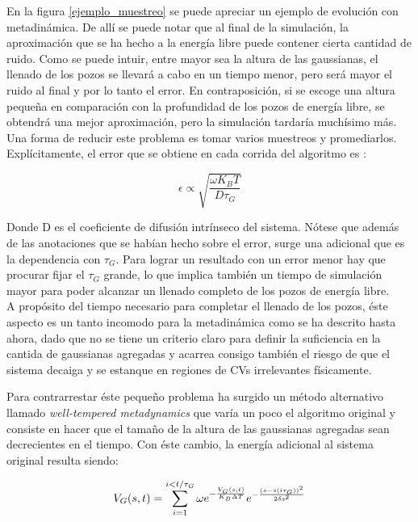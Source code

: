 \documentclass [11pt]{article}
\begin{document}
En la figura \ref{ejemplo_muestreo} se puede apreciar un ejemplo de evolución con metadinámica. De allí se puede notar que al final de la simulación, la aproximación que se ha hecho a la energía libre puede contener cierta cantidad de ruido. Como se puede intuir, entre mayor sea la altura de las gaussianas, el llenado de los pozos se llevará a cabo en un tiempo menor, pero será mayor el ruido al final y por lo tanto el error. En contraposición, si se escoge una altura pequeña en comparación con la profundidad de los pozos de energía libre, se obtendrá una mejor aproximación, pero la simulación tardaría muchísimo más. Una forma de reducir este problema es tomar varios muestreos y promediarlos. Explícitamente, el error que se obtiene en cada corrida del algoritmo es \cite{barducci}:

\begin{equation}
    \epsilon \propto\sqrt{\frac{\omega K_BT}{D\tau_G}}
\end{equation}

Donde D es el coeficiente de difusión intrínseco del sistema. Nótese que además de las anotaciones que se habían hecho sobre el error, surge una adicional que es la dependencia con $\tau_G$. Para lograr un resultado con un error menor hay que procurar fijar el $\tau_G$ grande, lo que implica también un tiempo de simulación mayor para poder alcanzar un llenado completo de los pozos de energía libre.\\

A propósito del tiempo necesario para completar el llenado de los pozos, éste aspecto es un tanto incomodo para la metadinámica como se ha descrito hasta ahora, dado que no se tiene un criterio claro para definir la suficiencia en la cantida de gaussianas agregadas y acarrea consigo también el riesgo de que el sistema decaiga y se estanque en regiones de CVs irrelevantes físicamente.

Para contrarrestar éste pequeño problema ha surgido un método alternativo llamado {\it well-tempered metadynamics}  \cite{wellmeta} que varía un poco el algoritmo original y consiste en hacer que el tamaño de la altura de las gaussianas agregadas sean decrecientes en el tiempo. Con éste cambio, la energía adicional al sistema original resulta siendo:

\begin{equation}
     V_G(s,t)=\sum_{i=1}^{i<t/\tau_G}\omega e^{-\frac{V_G(s,t)}{K_B\Delta T}}e^{-\frac{(s-s(i \tau_{\small{G}}))^2}{2\delta s^2}}
\end{equation}
\end{document}
